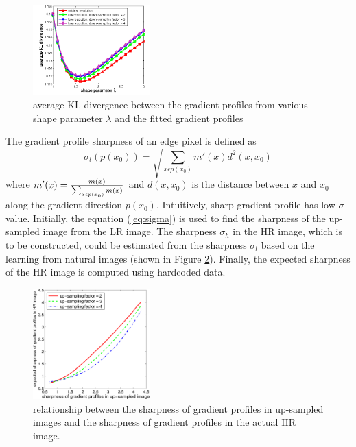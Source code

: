 \documentclass[a4paper,11pt]{article}
\begin{document}
\begin{figure}[H]
	\centering
	\includegraphics[width=0.4\textwidth]{3-Figure2-1.png}
	\caption{average KL-divergence between the gradient profiles from various shape parameter $\lambda$ and the fitted gradient profiles}
	\label{fig:shapep}
\end{figure}

The gradient profile sharpness of an edge pixel is defined as
\begin{equation}
	\label{eq:sigma}
	\sigma_l(p(x_0)) = \sqrt{\sum_{x \epsilon p(x_0)} m'(x) d^2(x, x_0)}
\end{equation}
where $m'(x) = {m(x) \over \sum_{x \epsilon p(x_0)} m(x)}$ and $d(x,x_0)$ is the distance between $x$ and $x_0$ along the gradient direction $p(x_0)$. Intuitively, sharp gradient profile has low $\sigma$ value. Initially, the equation (\ref{eq:sigma}) is used to find the sharpness of the up-sampled image from the LR image. The sharpness $\sigma_h$ in the HR image, which is to be constructed, could be estimated from the sharpness $\sigma_l$ based on the learning from natural images (shown in Figure \ref{fig:es}). Finally, the expected sharpness of the HR image is computed using hardcoded data.

\begin{figure}[H]
	\centering
	\includegraphics[width=0.4\textwidth]{Expected-sharpness-of-the-gradient-profiles-in-HR-image-with-respect-to-sharpness-of-the.png}
	\caption{relationship between the sharpness of gradient profiles in up-sampled images and the sharpness of gradient profiles in the actual HR image.}
	\label{fig:es}
\end{figure}
\end{document}
